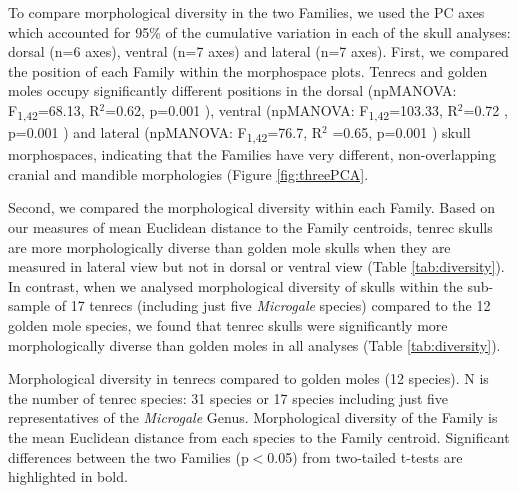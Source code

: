 \documentclass[12pt,a4paper]{article}
\begin{document}
	To compare morphological diversity in the two Families, we used the PC axes which accounted for 95\% of the cumulative variation in each of the skull analyses: dorsal (n=6 axes), ventral (n=7 axes) and lateral (n=7 axes). First, we compared the position of each Family within the morphospace plots. Tenrecs and golden moles occupy significantly different positions in the dorsal (npMANOVA: F\textsubscript{1,42}=68.13, R$^2$=0.62, p=0.001 ), ventral (npMANOVA: F\textsubscript{1,42}=103.33, R$^2$=0.72 , p=0.001 ) and lateral (npMANOVA: F\textsubscript{1,42}=76.7, R$^2$ =0.65, p=0.001 ) skull morphospaces,  indicating that the Families have very different, non-overlapping cranial and mandible morphologies (Figure \ref{fig:threePCA}. 
	
	Second, we compared the morphological diversity within each Family. Based on our measures of mean Euclidean distance to the Family centroids, tenrec skulls are more morphologically diverse than golden mole skulls when they are measured in lateral view but not in dorsal or ventral view (Table \ref{tab:diversity}). In contrast, when we analysed morphological diversity of skulls within the sub-sample of 17 tenrecs (including just five \textit{Microgale} species) compared to the 12 golden mole species, we found that tenrec skulls were significantly more morphologically diverse than golden moles in all analyses (Table \ref{tab:diversity}).


	\begin{table}[!htbp]			
		\caption[Comparing morphological diversity in tenrecs and golden moles.]
		{Morphological diversity in tenrecs compared to golden moles (12 species). N is the number of tenrec species: 31 species or 17 species including just five representatives of the \textit{Microgale} Genus. Morphological diversity of the Family is the mean Euclidean distance from each species to the Family centroid. Significant differences between the two Families (p$<$0.05) from two-tailed t-tests are highlighted in bold.}
		 
		\label{tab:diversity}  
	\end{table}
\end{document}
